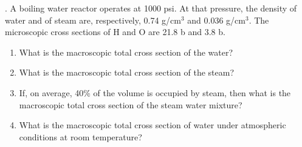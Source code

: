 . A boiling water reactor operates at 1000 psi.  At that pressure, the density of water and of steam are, respectively, 0.74 g/cm$^3$ and 0.036 g/cm$^3$.  The microscopic cross sections of H and O are 21.8 b and 3.8 b.
\begin{enumerate}[label=(\alph*)]
\item What is the macroscopic total cross section of the water?
\item What is the macroscopic total cross section of the steam?
\item If, on average, 40\% of the volume is occupied by steam, then what is the macroscopic total cross section of the steam water mixture?
\item What is the macroscopic total cross section of water under atmospheric conditions at room temperature?
\end{enumerate}

